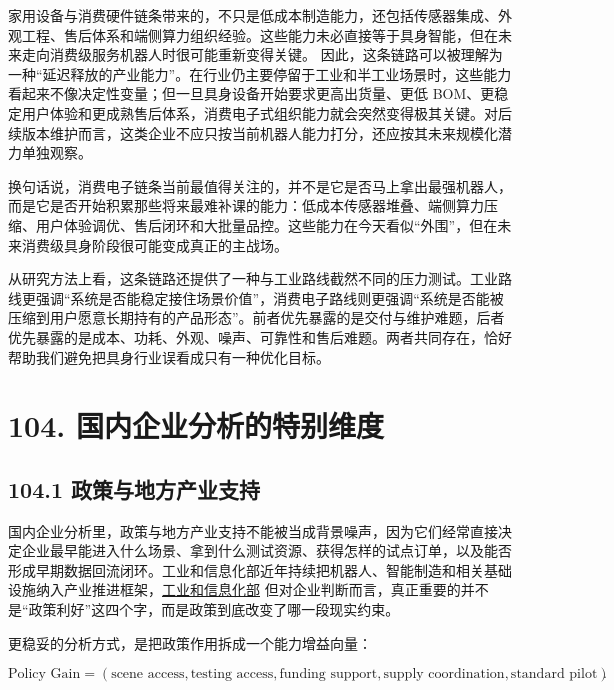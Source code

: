 家用设备与消费硬件链条带来的，不只是低成本制造能力，还包括传感器集成、外观工程、售后体系和端侧算力组织经验。这些能力未必直接等于具身智能，但在未来走向消费级服务机器人时很可能重新变得关键。 因此，这条链路可以被理解为一种“延迟释放的产业能力”。在行业仍主要停留于工业和半工业场景时，这些能力看起来不像决定性变量；但一旦具身设备开始要求更高出货量、更低 BOM、更稳定用户体验和更成熟售后体系，消费电子式组织能力就会突然变得极其关键。对后续版本维护而言，这类企业不应只按当前机器人能力打分，还应按其未来规模化潜力单独观察。

换句话说，消费电子链条当前最值得关注的，并不是它是否马上拿出最强机器人，而是它是否开始积累那些将来最难补课的能力：低成本传感器堆叠、端侧算力压缩、用户体验调优、售后闭环和大批量品控。这些能力在今天看似“外围”，但在未来消费级具身阶段很可能变成真正的主战场。

从研究方法上看，这条链路还提供了一种与工业路线截然不同的压力测试。工业路线更强调“系统是否能稳定接住场景价值”，消费电子路线则更强调“系统是否能被压缩到用户愿意长期持有的产品形态”。前者优先暴露的是交付与维护难题，后者优先暴露的是成本、功耗、外观、噪声、可靠性和售后难题。两者共同存在，恰好帮助我们避免把具身行业误看成只有一种优化目标。

\section*{104. 国内企业分析的特别维度}

\subsection*{104.1 政策与地方产业支持}


国内企业分析里，政策与地方产业支持不能被当成背景噪声，因为它们经常直接决定企业最早能进入什么场景、拿到什么测试资源、获得怎样的试点订单，以及能否形成早期数据回流闭环。工业和信息化部近年持续把机器人、智能制造和相关基础设施纳入产业推进框架，\href{https://www.miit.gov.cn/}{工业和信息化部} 但对企业判断而言，真正重要的并不是“政策利好”这四个字，而是政策到底改变了哪一段现实约束。

更稳妥的分析方式，是把政策作用拆成一个能力增益向量：

\begingroup
\scriptsize
\begin{equation*}
\text{Policy Gain} =
(\text{scene access}, \text{testing access}, \text{funding support}, \text{supply coordination}, \text{standard pilot}).
\end{equation*}
\endgroup

